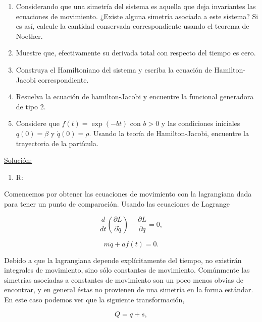 \documentclass[a4paper,10pt]{article}
\numberwithin{equation}{section}
\begin{document}
\begin{enumerate}[label=\alph*)]
 \item Considerando que una simetría del sistema es aquella que deja invariantes las 
 ecuaciones de movimiento. ¿Existe alguna simetría asociada a este sistema? Si es así,
 calcule la cantidad conservada correspondiente usando el teorema de Noether.
 \item Muestre que, efectivamente su derivada total con respecto del tiempo es cero.
 \item Construya el Hamiltoniano del sistema y escriba la ecuación de Hamilton-Jacobi 
 correspondiente.
 \item Resuelva la ecuación de hamilton-Jacobi y encuentre la funcional generadora de 
 tipo 2.
 \item Considere que $f(t) = \exp{(-bt)}$ con $b > 0$ y las condiciones iniciales
 $q(0) = \beta$ y $\dot{q}(0) = \rho$. Usando la teoría de Hamilton-Jacobi, encuentre 
 la trayectoria de la partícula.
\end{enumerate}

\vspace{.3cm}

\underline{Solución:} \vspace{.3cm}

\begin{enumerate}[label=\alph*)]
 \item R:
\end{enumerate}

Comencemos por obtener las ecuaciones de movimiento con la lagrangiana dada para 
tener un punto de comparación. Usando las ecuaciones de Lagrange 

\begin{equation}
 \frac{d}{dt}\left(\frac{\partial L}{\partial \dot{q}}\right) 
 - \frac{\partial L}{\partial q} = 0,
\end{equation}

\begin{equation}
 m\ddot{q} + af(t) = 0.
\end{equation}

Debido a que la lagrangiana depende explícitamente del tiempo, no existirán integrales 
de movimiento, sino sólo constantes de movimiento. Comúnmente las simetrías asociadas 
a constantes de movimiento son un poco menos obvias de encontrar, y en general éstas 
no provienen de una simetría en la forma estándar. En este caso podemos ver que 
la siguiente transformación, 

\begin{equation}
 Q = q + s,
\end{equation}
\end{document}
